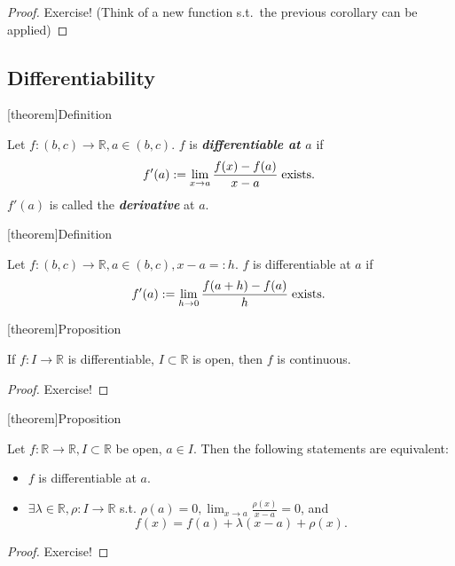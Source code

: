 \documentclass[12pt]{report}
\theoremstyle{definition}
\begin{document}
\begin{proof}
    Exercise! (Think of a new function s.t.\ the previous corollary can be applied)
\end{proof}

\subsection{Differentiability}

[theorem]{Definition}
\begin{differrentiable}
    Let $f:(b,c) \rightarrow{} \mathbb{R}, a \in (b,c)$.
    $f$ is \textbf{\emph{differentiable at $a$}} if\[
        f'(a) := \lim_{x\rightarrow{}a} \frac{f(x) - f(a)}{x - a} \;\textnormal{exists.}\;
    \]$f'(a)$ is called the \textbf{\emph{derivative}} at $a$.
\end{differrentiable}

[theorem]{Definition}
\begin{differentiable alternative def}
    Let $f:(b,c) \rightarrow{} \mathbb{R}, a \in (b,c), x - a =: h$.
    $f$ is differentiable at $a$ if\[
        f'(a) := \lim_{h\rightarrow{}0} \frac{f(a + h) - f(a)}{h} \;\textnormal{exists.}\;
    \]
\end{differentiable alternative def}

[theorem]{Proposition}
\begin{differentiable means continuous}
    If $f:I\rightarrow{}\mathbb{R}$ is differentiable, $I \subset \mathbb{R}$ is open, 
    then $f$ is continuous.
\end{differentiable means continuous}

\begin{proof}
    Exercise!
\end{proof}

[theorem]{Proposition}
\begin{construct secant around a}
    Let $f:\mathbb{R}\rightarrow{}\mathbb{R}, I \subset \mathbb{R}$ be open, $a \in I$.
    Then the following statements are equivalent:
    \begin{itemize}
            \item $f$ is differentiable at $a$.
            \item $\exists \lambda \in \mathbb{R}, \rho:I\rightarrow{}\mathbb{R}$
            s.t. $\rho (a) = 0, \lim_{x\rightarrow{}a} \frac{\rho(x)}{x-a} = 0$, and\[
                    f(x) = f(a) + \lambda(x-a) + \rho(x).
                \]
    \end{itemize}
\end{construct secant around a}

\begin{proof}
    Exercise!
\end{proof}





\end{document}
